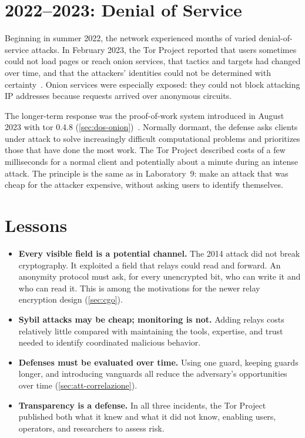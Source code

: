 \section{2022--2023: Denial of Service}\label{sec:casi-dos}

Beginning in summer 2022, the network experienced months of varied denial-of-service attacks. In February 2023, the Tor Project reported that users sometimes could not load pages or reach onion services, that tactics and targets had changed over time, and that the attackers' identities could not be determined with certainty~\cite{torblog2023dos}. Onion services were especially exposed: they could not block attacking IP addresses because requests arrived over anonymous circuits.

The longer-term response was the proof-of-work system introduced in August 2023 with tor 0.4.8 (\cref{sec:dos-onion})~\cite{torblog2023pow}. Normally dormant, the defense asks clients under attack to solve increasingly difficult computational problems and prioritizes those that have done the most work. The Tor Project described costs of a few milliseconds for a normal client and potentially about a minute during an intense attack. The principle is the same as in Laboratory~9: make an attack that was cheap for the attacker expensive, without asking users to identify themselves.

\section{Lessons}\label{sec:casi-lezioni}

\begin{itemize}
  \item \textbf{Every visible field is a potential channel.} The 2014 attack did not break cryptography. It exploited a field that relays could read and forward. An anonymity protocol must ask, for every unencrypted bit, who can write it and who can read it. This is among the motivations for the newer relay encryption design (\cref{sec:cgo}).
  \item \textbf{Sybil attacks may be cheap; monitoring is not.} Adding relays costs relatively little compared with maintaining the tools, expertise, and trust needed to identify coordinated malicious behavior.
  \item \textbf{Defenses must be evaluated over time.} Using one guard, keeping guards longer, and introducing vanguards all reduce the adversary's opportunities over time (\cref{sec:att-correlazione}).
  \item \textbf{Transparency is a defense.} In all three incidents, the Tor Project published both what it knew and what it did not know, enabling users, operators, and researchers to assess risk.
\end{itemize}

